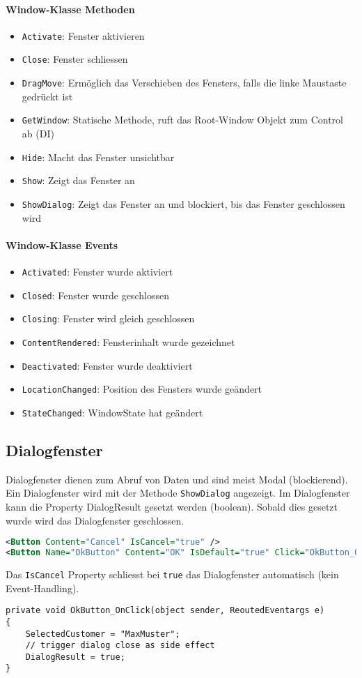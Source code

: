 \paragraph{Window-Klasse Methoden}
\begin{itemize}
\item \verb+Activate+: Fenster aktivieren
\item \verb+Close+: Fenster schliessen
\item \verb+DragMove+: Ermöglich das Verschieben des Fensters, falls die linke Maustaste gedrückt ist
\item \verb+GetWindow+: Statische Methode, ruft das Root-Window Objekt zum Control ab (DI)
\item \verb+Hide+: Macht das Fenster unsichtbar
\item \verb+Show+: Zeigt das Fenster an
\item \verb+ShowDialog+: Zeigt das Fenster an und blockiert, bis das Fenster geschlossen wird
\end{itemize}
\paragraph{Window-Klasse Events}
\begin{itemize}
\item \verb+Activated+: Fenster wurde aktiviert
\item \verb+Closed+: Fenster wurde geschlossen
\item \verb+Closing+: Fenster wird gleich geschlossen
\item \verb+ContentRendered+: Fensterinhalt wurde gezeichnet
\item \verb+Deactivated+: Fenster wurde deaktiviert
\item \verb+LocationChanged+: Position des Fensters wurde geändert
\item \verb+StateChanged+: WindowState hat geändert
\end{itemize}
\subsection{Dialogfenster} 
Dialogfenster dienen zum Abruf von Daten und sind meist Modal (blockierend). \\
Ein Dialogfenster wird mit der Methode \verb+ShowDialog+ angezeigt. Im Dialogfenster kann die Property DialogResult gesetzt werden (boolean). Sobald dies gesetzt wurde wird das Dialogfenster geschlossen. 
\begin{lstlisting}[language=xml]
<Button Content="Cancel" IsCancel="true" />
<Button Name="OkButton" Content="OK" IsDefault="true" Click="OkButton_OnClick" />
\end{lstlisting}
Das \verb+IsCancel+ Property schliesst bei \verb+true+ das Dialogfenster automatisch (kein Event-Handling).
\begin{lstlisting}
private void OkButton_OnClick(object sender, ReoutedEventargs e)
{
    SelectedCustomer = "MaxMuster";
    // trigger dialog close as side effect
    DialogResult = true; 
}
\end{lstlisting}
